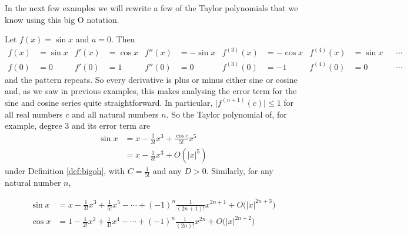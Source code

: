 In the next few examples we will rewrite a few of the Taylor
polynomials that we know using this big O notation.
\begin{eg}\label{eg:bigohsincos}
Let $f(x)=\sin x$ and $a=0$. Then
\begin{align*}
f(x)&=\sin x &
f'(x)&=\cos x &
f''(x)&=-\sin x &
f^{(3)}(x)&=-\cos x &
f^{(4)}(x)&=\sin x & &\cdots\\
f(0)&=0 &
f'(0)&=1 &
f''(0)&=0 &
f^{(3)}(0)&=-1 &
f^{(4)}(0)&=0 & &\cdots
\end{align*}
and the pattern repeats. So every derivative is plus or minus either
sine or cosine and, as we saw in previous examples,
this makes analysing the error term for the sine and cosine series quite straightforward. In particular,
$\big|f^{(n+1)}(c)\big|\le 1$ for all real numbers $c$ and all
natural numbers $n$. So the Taylor polynomial of, for
example, degree 3 and its error term are
\begin{align*}
\sin x &= x-\tfrac{1}{3!}x^3+\tfrac{\cos c}{5!} x^5\\
       &= x-\tfrac{1}{3!}x^3+O(|x|^5)
\end{align*}
under Definition \ref{def:bigoh}, with $C=\tfrac{1}{5!}$ and any $D>0$.
Similarly, for any natural number $n$,
\begin{impeqn}\label{eq:SRsincosExp}
\begin{align*}
\sin x&=x-\tfrac{1}{3!}x^3+\tfrac{1}{5!}x^5-\cdots+(-1)^{n}\tfrac{1}{(2n+1)!}
x^{2n+1} +O\big( |x|^{2n+3}\big)\\
\cos x&=1-\tfrac{1}{2!}x^2+\tfrac{1}{4!}x^4-\cdots+(-1)^{n}\tfrac{1}{(2n)!}
x^{2n} +O\big( |x|^{2n+2}\big)
\end{align*}
\end{impeqn}

\end{eg}

